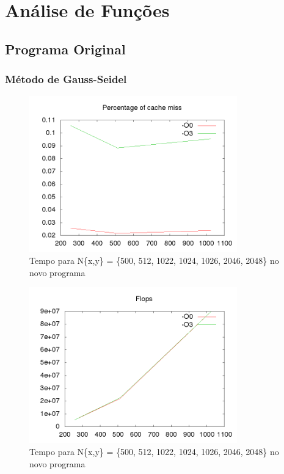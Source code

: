 \documentclass[12pt]{article}
\begin{document}
\section{Análise de Funções}

	\subsection{Programa Original}
		\subsubsection{Método de Gauss-Seidel}
		\begin{figure}[ht!]
			\centering
			\includegraphics[width=90mm]{old_gs_cache.png}
			\caption{Tempo para N\{x,y\} = \{500, 512, 1022, 1024, 1026, 2046, 2048\} no novo programa
			\label{overflow}}
		\end{figure}
		\newpage
		
		\begin{figure}[ht!]
			\centering
			\includegraphics[width=90mm]{old_gs_flops.png}
			\caption{Tempo para N\{x,y\} = \{500, 512, 1022, 1024, 1026, 2046, 2048\} no novo programa
			\label{overflow}}
		\end{figure}
		\newpage
		
\end{document}
